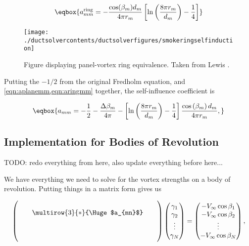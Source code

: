 \begin{equation}
	\label{eqn:aringmm}
	\eqbox{
	a^\text{ring}_{mm} = - \frac{\cos(\beta_m)d_m}{4 \pi r_m} \left[ \ln \left(\frac{8 \pi r_m}{d_m}\right) - \frac{1}{4}\right]
}
\end{equation}

\begin{figure}[h!]
	\centering
	\texttt{[image: ./ductsolvercontents/ductsolverfigures/smokeringselfinduction]}
	\caption{Figure displaying panel-vortex ring equivalence. Taken from Lewis \cite{Lewis_1991}.}
	\label{fig:smokeringselfinduction}
\end{figure}



Putting the \(-1/2\) from the original Fredholm equation, and \cref{eqn:aplanemm,eqn:aringmm} together, the self-influence coefficient is

\begin{equation}
	\eqbox{
		a_{mm} = -\frac{1}{2}
		- \frac{\Delta \beta_m}{4 \pi}
		- \left[ \ln \left(\frac{8 \pi r_m}{d_m}\right) - \frac{1}{4} \right] \frac{\cos\left(\beta_m\right)d_m}{4\pi r_m} ,
	}
\end{equation}


\subsection{Implementation for Bodies of Revolution}

TODO: redo everything from here, also update everything before here...

We have everything we need to solve for the vortex strengths on a body of revolution.
Putting things in a matrix form gives us

\begin{equation}
	\label{eqn:axisym_linear_system}
	\begin{pmatrix}
		& & & &  \\
		& & \multirow{3}{*}{\Huge $a_{mn}$}  & &  \\
		& & & &  \\
		& & & &  \\
		& & & &
	\end{pmatrix}
	\begin{pmatrix}
		\gamma_1 \\
		\gamma_2 \\
		\vdots \\
		\gamma_N
	\end{pmatrix}
	=
	\begin{pmatrix}
		-V_\infty\cos \beta_1 \\
		-V_\infty\cos \beta_2 \\
		\vdots \\
		-V_\infty\cos \beta_N \\
	\end{pmatrix},
\end{equation}

